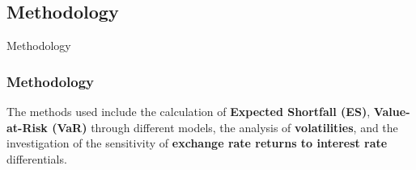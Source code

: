 \documentclass[10pt]{beamer}
\begin{document}
\begin{frame}
\section{Methodology}
\centering \LARGE Methodology
\end{frame}
\begin{frame}
\frametitle{Methodology}
The methods used include the calculation of \textbf{Expected Shortfall (ES)}, \textbf{Value-at-Risk (VaR)} through different models, the analysis of \textbf{volatilities}, and the investigation of the sensitivity of \textbf{exchange rate returns to interest rate} differentials.
\end{frame}


\end{document}
